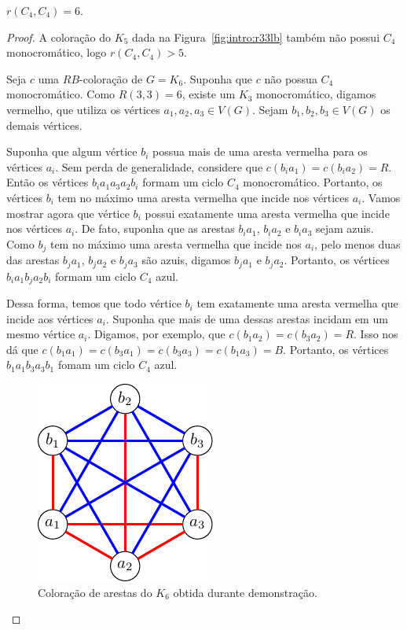 \begin{theorem}
$r(C_4,C_4) = 6$.
\end{theorem}
\begin{proof}
A coloração do $K_5$ dada na Figura~\ref{fig:intro:r33lb} também não possui $C_4$ monocromático, logo $r(C_4,C_4) > 5$.

Seja $c$ uma $RB$-coloração de $G = K_6$. Suponha que $c$ não possua $C_4$ monocromático. Como $R(3,3) = 6$, existe um $K_3$ monocromático, digamos vermelho, que utiliza os vértices $a_1,a_2,a_3 \in V(G)$. Sejam $b_1,b_2,b_3 \in V(G)$ os demais vértices.

Suponha que algum vértice $b_i$ possua mais de uma aresta vermelha para os vértices $a_i$. Sem perda de generalidade, considere que $c(b_ia_1) = c(b_ia_2) = R$. Então os vértices $b_i a_1 a_3 a_2 b_i$ formam um ciclo $C_4$ monocromático. Portanto, os vértices $b_i$ tem no máximo uma aresta vermelha que incide nos vértices $a_i$. Vamos mostrar agora que vértice $b_i$ possui exatamente uma aresta vermelha que incide nos vértices $a_i$. De fato, suponha que as arestas $b_i a_1$, $b_i a_2$ e $b_i a_3$ sejam azuis. Como $b_j$ tem no máximo uma aresta vermelha que incide nos $a_i$, pelo menos duas das arestas $b_j a_1$, $b_j a_2$ e $b_j a_3$ são azuis, digamos $b_j a_1$ e $b_j a_2$.
Portanto, os vértices $b_i a_1 b_j a_2 b_i$ formam um ciclo $C_4$ azul.

Dessa forma, temos que todo vértice $b_i$ tem exatamente uma aresta vermelha que incide aos vértices $a_i$. Suponha que mais de uma dessas arestas incidam em um mesmo vértice $a_i$. Digamos, por exemplo, que $c(b_1 a_2) = c(b_3 a_2) = R$. Isso nos dá que $c(b_1 a_1) = c(b_3 a_1) = c(b_3 a_3) = c(b_1 a_3) = B$. Portanto, os vértices $b_1 a_1 b_3 a_3 b_1$ fomam um ciclo $C_4$ azul.

\begin{figure}[ht!]
\centering
\includegraphics{figures/3_graph_3_cycle4}
\caption{Coloração de arestas do $K_6$ obtida durante demonstração.}
\label{graph:fig:cycle4}
\end{figure}


\end{proof}

